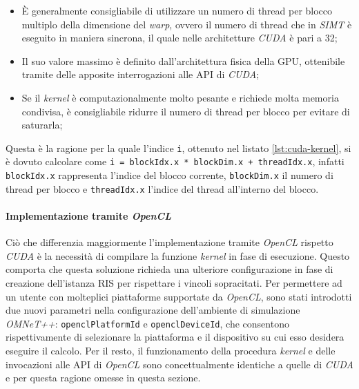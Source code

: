 \begin{itemize}
  \item È generalmente consigliabile di utilizzare un numero di thread per blocco
    multiplo della dimensione del \textit{warp}, ovvero il numero di thread che in
    \textit{SIMT} è eseguito in maniera sincrona, il quale nelle architetture \textit{CUDA}
    è pari a 32;

  \item Il suo valore massimo è definito dall'architettura fisica della GPU,
    ottenibile tramite delle apposite interrogazioni alle API di \textit{CUDA};

  \item Se il \textit{kernel} è computazionalmente molto pesante e richiede
    molta memoria condivisa, è consigliabile ridurre il numero di thread per blocco
    per evitare di saturarla;
\end{itemize}

Questa è la ragione per la quale l'indice \texttt{i}, ottenuto nel listato
\ref{lst:cuda-kernel}, si è dovuto calcolare come \texttt{i = blockIdx.x *
blockDim.x + threadIdx.x}, infatti \texttt{blockIdx.x} rappresenta l'indice del
blocco corrente, \texttt{blockDim.x} il numero di thread per blocco e \texttt{threadIdx.x}
l'indice del thread all'interno del blocco.

\paragraph{Implementazione tramite \textit{OpenCL}}
\label{para:opencl}

Ciò che differenzia maggiormente l'implementazione tramite \textit{OpenCL}
rispetto \textit{CUDA} è la necessità di compilare la funzione \textit{kernel}
in fase di esecuzione. Questo comporta che questa soluzione richieda una ulteriore
configurazione in fase di creazione dell'istanza RIS per rispettare i vincoli sopracitati.
Per permettere ad un utente con molteplici piattaforme supportate da \textit{OpenCL},
sono stati introdotti due nuovi parametri nella configurazione dell'ambiente di
simulazione \textit{OMNeT++}: \texttt{openclPlatformId} e \texttt{openclDeviceId},
che consentono rispettivamente di selezionare la piattaforma e il dispositivo su
cui esso desidera eseguire il calcolo. Per il resto, il funzionamento della procedura
\textit{kernel} e delle invocazioni alle API di \textit{OpenCL} sono concettualmente
identiche a quelle di \textit{CUDA} e per questa ragione omesse in questa
sezione.

